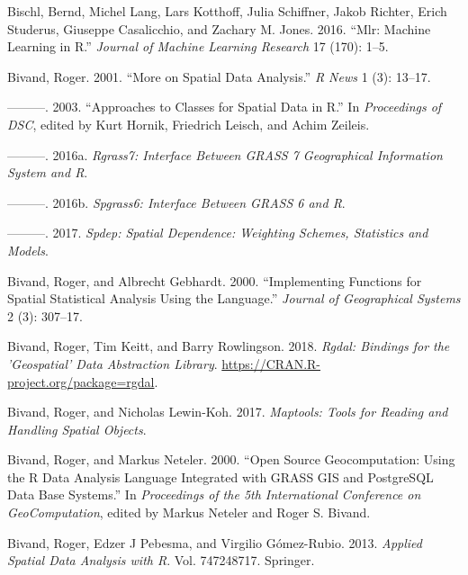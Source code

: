 \documentclass[]{krantz}
\begin{document}
\leavevmode\hypertarget{ref-bischl_mlr:_2016}{}%
Bischl, Bernd, Michel Lang, Lars Kotthoff, Julia Schiffner, Jakob Richter, Erich Studerus, Giuseppe Casalicchio, and Zachary M. Jones. 2016. ``Mlr: Machine Learning in R.'' \emph{Journal of Machine Learning Research} 17 (170): 1--5.

\leavevmode\hypertarget{ref-bivand_more_2001}{}%
Bivand, Roger. 2001. ``More on Spatial Data Analysis.'' \emph{R News} 1 (3): 13--17.

\leavevmode\hypertarget{ref-hornik_approaches_2003}{}%
---------. 2003. ``Approaches to Classes for Spatial Data in R.'' In \emph{Proceedings of DSC}, edited by Kurt Hornik, Friedrich Leisch, and Achim Zeileis.

\leavevmode\hypertarget{ref-bivand_rgrass7_2016}{}%
---------. 2016a. \emph{Rgrass7: Interface Between GRASS 7 Geographical Information System and R}.

\leavevmode\hypertarget{ref-bivand_spgrass6_2016}{}%
---------. 2016b. \emph{Spgrass6: Interface Between GRASS 6 and R}.

\leavevmode\hypertarget{ref-bivand_spdep_2017}{}%
---------. 2017. \emph{Spdep: Spatial Dependence: Weighting Schemes, Statistics and Models}.

\leavevmode\hypertarget{ref-bivand_implementing_2000}{}%
Bivand, Roger, and Albrecht Gebhardt. 2000. ``Implementing Functions for Spatial Statistical Analysis Using the Language.'' \emph{Journal of Geographical Systems} 2 (3): 307--17.

\leavevmode\hypertarget{ref-R-rgdal}{}%
Bivand, Roger, Tim Keitt, and Barry Rowlingson. 2018. \emph{Rgdal: Bindings for the 'Geospatial' Data Abstraction Library}. \url{https://CRAN.R-project.org/package=rgdal}.

\leavevmode\hypertarget{ref-bivand_maptools_2017}{}%
Bivand, Roger, and Nicholas Lewin-Koh. 2017. \emph{Maptools: Tools for Reading and Handling Spatial Objects}.

\leavevmode\hypertarget{ref-bivand_open_2000}{}%
Bivand, Roger, and Markus Neteler. 2000. ``Open Source Geocomputation: Using the R Data Analysis Language Integrated with GRASS GIS and PostgreSQL Data Base Systems.'' In \emph{Proceedings of the 5th International Conference on GeoComputation}, edited by Markus Neteler and Roger S. Bivand.

\leavevmode\hypertarget{ref-bivand_applied_2013}{}%
Bivand, Roger, Edzer J Pebesma, and Virgilio Gómez-Rubio. 2013. \emph{Applied Spatial Data Analysis with R}. Vol. 747248717. Springer.
\end{document}
